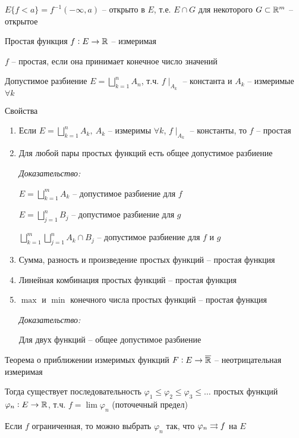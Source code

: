 \documentclass[12pt]{article}
\begin{document}
$E\{f < a\} = f^{-1}(-\infty, a)$ -- открыто в $E$, т.е. $E \cap G$ для некоторого $G \subset \mathbb R^m$ -- открытое 

\begin{defin}{Простая функция}
    $f : E \to \mathbb R$ -- измеримая

    $f$ -- простая, если она принимает конечное число значений 
\end{defin}

\begin{defin}{Допустимое разбиение}
    $E = \bigsqcup\limits_{k = 1}^n A_n$, т.ч. $f\mid_{A_k}$ -- константа и $A_k$ -- измеримые $\forall k$
\end{defin}

\begin{theo}{Свойства}
    \begin{enumerate}
        \item Если $E = \bigsqcup\limits_{k = 1}^n A_k,\ A_k$ -- измеримы $\forall k$, $f \mid_{A_k}$ -- константы, то $f$ -- простая
        \item Для любой пары простых функций есть общее допустимое разбиение 
        
        \textit{Доказательство:}

        $E = \bigsqcup\limits_{k = 1}^m A_k$ -- допустимое разбиение для $f$

        $E = \bigsqcup\limits_{j = 1}^n B_j$ -- допустимое разбиение для $g$

        $\bigsqcup\limits_{k = 1}^m \bigsqcup\limits_{j = 1}^n A_k \cap B_j$ -- допустимое разбиение для $f$ и $g$

        \item Сумма, разность и произведение простых функций -- простая функция 
        \item Линейная комбинация простых функций -- простая функция 
        \item $\max$ и $\min$ конечного числа простых функций -- простая функция 
        
        \textit{Доказательство:}

        Для двух функций -- общее допустимое разбиение
    \end{enumerate}
\end{theo}

\begin{theo}{Теорема о приближении измеримых функций}
    $F : E \to \overline{\mathbb R}$ -- неотрицательная измеримая 

    Тогда существует последовательность $\varphi_1 \leq \varphi_2 \leq \varphi_3 \leq \ldots$ простых функций $\varphi_n : E \to \mathbb R$, т.ч. $f = \lim \varphi_n$ (поточечный предел)

    Если $f$ ограниченная, то можно выбрать $\varphi_n$ так, что $\varphi_n \rightrightarrows f$ на $E$
\end{theo}
\end{document}
